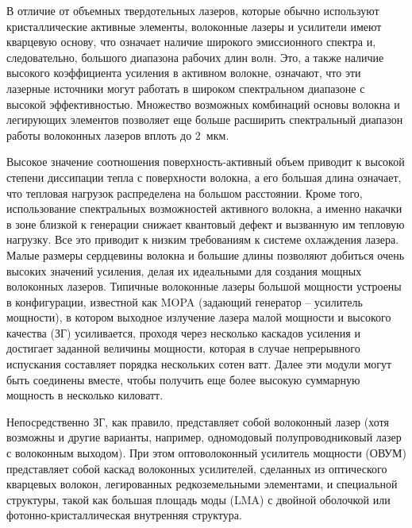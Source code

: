 В отличие от объемных твердотельных лазеров, которые обычно используют кристаллические активные элементы, волоконные лазеры и усилители имеют кварцевую основу, что означает наличие широкого эмиссионного спектра и, следовательно, большого диапазона рабочих длин волн. Это, а также наличие высокого коэффициента усиления в активном волокне, означают, что эти лазерные источники могут работать в широком спектральном диапазоне с высокой эффективностью. Множество возможных комбинаций основы волокна и легирующих элементов позволяет еще больше расширить спектральный диапазон работы волоконных лазеров вплоть до 2~мкм.

Высокое значение соотношения поверхность-активный объем приводит к высокой степени диссипации тепла с поверхности волокна, а его большая длина означает, что тепловая нагрузок распределена на большом расстоянии. Кроме того, использование спектральных возможностей активного волокна, а именно накачки в зоне близкой к генерации снижает квантовый дефект и вызванную им тепловую нагрузку. Все это приводит к низким требованиям к системе охлаждения лазера. Малые размеры сердцевины волокна и большие длины позволяют добиться очень высоких значений усиления, делая их идеальными для создания мощных волоконных лазеров. Типичные волоконные лазеры большой мощности устроены в конфигурации, известной как MOPA (задающий генератор -- усилитель мощности), в котором выходное излучение лазера малой мощности и высокого качества (ЗГ) усиливается, проходя через несколько каскадов усиления и достигает заданной величины мощности, которая в случае непрерывного испускания составляет порядка нескольких сотен ватт. Далее эти модули могут быть соединены вместе, чтобы получить еще более высокую суммарную мощность в несколько киловатт.

Непосредственно ЗГ, как правило, представляет собой волоконный лазер (хотя возможны и другие варианты, например, одномодовый полупроводниковый лазер с волоконным выходом). При этом оптоволоконный усилитель мощности (ОВУМ) представляет собой каскад волоконных усилителей, сделанных из оптического кварцевых волокон, легированных редкоземельными элементами, и специальной структуры, такой как большая площадь моды (LMA) с двойной оболочкой или фотонно-кристаллическая внутренняя структура.

